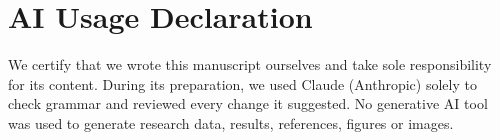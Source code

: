 \documentclass[conference]{IEEEtran}
\begin{document}
\section*{AI Usage Declaration}
We certify that we wrote this manuscript ourselves and take sole responsibility
for its content. During its preparation, we used Claude (Anthropic) solely to
check grammar and reviewed every change it suggested. No generative AI tool was
used to generate research data, results, references, figures or images.



\end{document}
